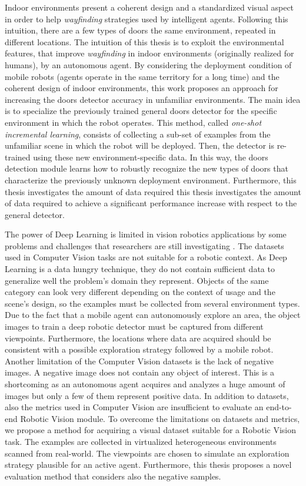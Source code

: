 Indoor environments present a coherent design and a standardized visual aspect in order to help \textit{wayfinding} strategies used by intelligent agents. Following this intuition, there are a few types of doors  the same environment, repeated in different locations. The intuition of this thesis is to exploit the environmental features, that improve \textit{wayfinding} in indoor environments (originally realized for humans), by an autonomous agent. By considering the deployment condition of mobile robots (agents operate in the same territory for a long time) and the coherent design of indoor environments, this work proposes an approach for increasing the doors detector accuracy in unfamiliar environments. The main idea is to specialize the previously trained general doors detector for the specific environment in which the robot operates. This method, called \textit{one-shot incremental learning}, consists of collecting a sub-set of examples from the unfamiliar scene in which the robot will be deployed. Then, the detector is re-trained using these new environment-specific data. In this way, the doors detection module learns how to robustly recognize the new types of doors that characterize the previously unknown deployment environment. Furthermore, this thesis investigates the amount of data required this thesis investigates the amount of data required to achieve a significant performance increase with respect to the general detector.

The power of Deep Learning is limited in vision robotics applications by some problems and challenges that researchers are still investigating \cite{surveydeeplimits}. The datasets used in Computer Vision tasks are not suitable for a robotic context. As Deep Learning is a data hungry technique, they do not contain sufficient data to generalize well the problem's domain they represent. Objects of the same category can look very different depending on the context of usage and the scene's design, so the examples must be collected from several environment types. Due to the fact that a mobile agent can autonomously explore an area, the object images to train a deep robotic detector must be captured from different viewpoints. Furthermore, the locations where data are acquired should be consistent with a possible exploration strategy followed by a mobile robot. Another limitation of the Computer Vision datasets is the lack of negative images. A negative image does not contain any object of interest. This is a shortcoming as an autonomous agent acquires and analyzes a huge amount of images but only a few of them represent positive data. In addition to datasets, also the metrics used in Computer Vision are insufficient to evaluate an end-to-end Robotic Vision module. To overcome the limitations on datasets and metrics, we propose a method for acquiring a visual dataset suitable for a Robotic Vision task. The examples are collected in virtualized heterogeneous environments scanned from real-world. The viewpoints are chosen to simulate an exploration strategy plausible for an active agent. Furthermore, this thesis proposes a novel evaluation method that considers also the negative samples.

